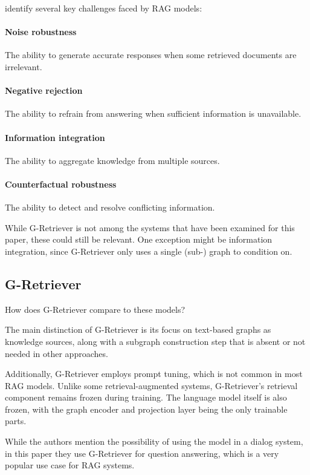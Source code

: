 \citet{benchmarking} identify several key challenges faced by RAG models:

\paragraph{Noise robustness} The ability to generate accurate responses when some retrieved documents are irrelevant.
\paragraph{Negative rejection} The ability to refrain from answering when sufficient information is unavailable.
\paragraph{Information integration} The ability to aggregate knowledge from multiple sources.
\paragraph{Counterfactual robustness} The ability to detect and resolve conflicting information.

While G-Retriever is not among the systems that have been examined for this paper, these could still be relevant.
One exception might be information integration, since G-Retriever only uses a single (sub-) graph to condition on.



\subsection{G-Retriever}

How does G-Retriever compare to these models?

The main distinction of G-Retriever is its focus on text-based graphs as knowledge sources, along with a subgraph construction step that is absent or not needed in other approaches.

Additionally, G-Retriever employs prompt tuning, which is not common in most RAG models.
Unlike some retrieval-augmented systems, G-Retriever's retrieval component remains frozen during training.
The language model itself is also frozen, with the graph encoder and projection layer being the only trainable parts.

While the authors mention the possibility of using the model in a dialog system, in this paper they use G-Retriever for question answering, which is a very popular use case for RAG systems.
